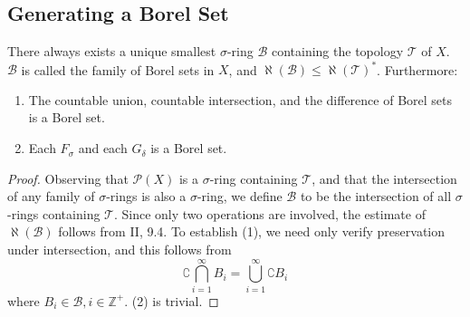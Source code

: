 \documentclass[12pt]{article} %
\begin{document}
\subsection{Generating a Borel Set}
	\begin{theorem}\parencite{Dugundji1966}

	There always exists a unique smallest $\sigma$-ring $\mathcal{B}$ containing the topology $\mathcal{T}$ of $X$. $\mathcal{B}$ is called the family of Borel sets in $X$, and $\aleph(\mathcal{B}) \leq \aleph(\mathcal{T})^*$. Furthermore:
	
	\begin{enumerate}
		\item The countable union, countable intersection, and the difference of Borel sets is a Borel set.
		\item Each $F_\sigma$ and each $G_\delta$ is a Borel set.
	\end{enumerate}
		\end{theorem}
\begin{proof}
	Observing that $\mathcal{P}(X)$ is a $\sigma$-ring containing $\mathcal{T}$, and that the intersection of any family of $\sigma$-rings is also a $\sigma$-ring, we define $\mathcal{B}$ to be the intersection of all $\sigma$-rings containing $\mathcal{T}$. Since only two operations are involved, the estimate of $\aleph(\mathcal{B})$ follows from II, 9.4. To establish (1), we need only verify preservation under intersection, and this follows from
	$$
	\complement \bigcap_{i=1}^\infty B_i = \bigcup_{i=1}^\infty \complement B_i
	$$
	where $B_i \in \mathcal{B}, i \in \mathbb{Z}^+$. (2) is trivial.
\end{proof}



\newpage
{}		
	\begingroup
            \printbibliography
        \endgroup
\end{document}

